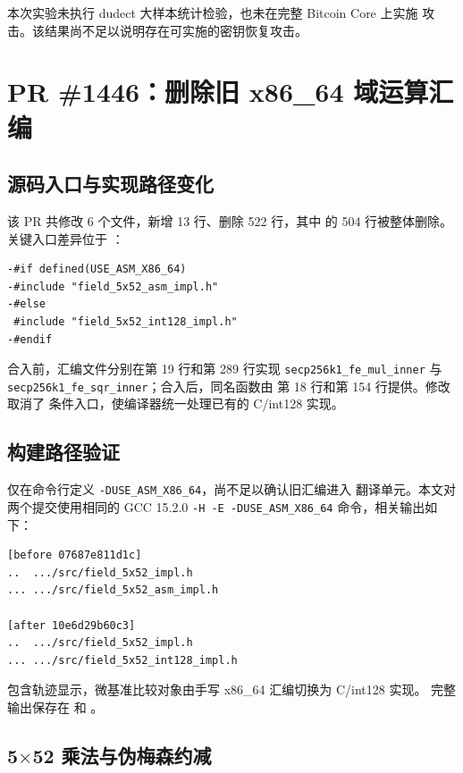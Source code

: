 \documentclass[UTF8,a4paper,zihao=-4]{ctexart}
\begin{document}
本次实验未执行 dudect 大样本统计检验，也未在完整 Bitcoin Core 上实施
攻击。该结果尚不足以说明存在可实施的密钥恢复攻击。

\section{PR \#1446：删除旧 x86\_64 域运算汇编}

\subsection{源码入口与实现路径变化}

该 PR 共修改 6 个文件，新增 13 行、删除 522 行，其中
 的 504 行被整体删除。关键入口差异位于
：

\begin{lstlisting}[style=ShellStyle,caption={PR \#1446 的核心代码差异},basicstyle=\scriptsize\ttfamily]
-#if defined(USE_ASM_X86_64)
-#include "field_5x52_asm_impl.h"
-#else
 #include "field_5x52_int128_impl.h"
-#endif
\end{lstlisting}

合入前，汇编文件分别在第 19 行和第 289 行实现
\texttt{secp256k1\_fe\_mul\_inner} 与
\texttt{secp256k1\_fe\_sqr\_inner}；合入后，同名函数由
 第 18 行和第 154 行提供。修改取消了
条件入口，使编译器统一处理已有的 C/int128 实现。

\subsection{构建路径验证}

仅在命令行定义 \texttt{-DUSE\_ASM\_X86\_64}，尚不足以确认旧汇编进入
翻译单元。本文对两个提交使用相同的 GCC 15.2.0
\texttt{-H -E -DUSE\_ASM\_X86\_64} 命令，相关输出如下：

\begin{lstlisting}[style=ShellStyle,caption={GCC -H 的相关输出},basicstyle=\scriptsize\ttfamily]
[before 07687e811d1c]
..  .../src/field_5x52_impl.h
... .../src/field_5x52_asm_impl.h

[after 10e6d29b60c3]
..  .../src/field_5x52_impl.h
... .../src/field_5x52_int128_impl.h
\end{lstlisting}

包含轨迹显示，微基准比较对象由手写 x86\_64 汇编切换为 C/int128 实现。
完整输出保存在  和
。

\subsection{5$\times$52 乘法与伪梅森约减}
\end{document}
